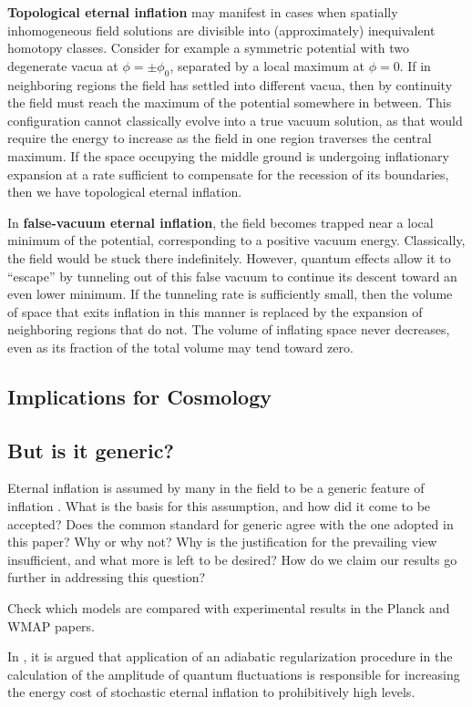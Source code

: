 \textbf{Topological eternal inflation} may manifest in cases when spatially inhomogeneous field solutions are divisible into (approximately) inequivalent homotopy classes.  
Consider for example a symmetric potential with two degenerate vacua at $\phi = \pm \phi_0$, separated by a local maximum at $\phi = 0$.  
If in neighboring regions the field has settled into different vacua, then by continuity the field must reach the maximum of the potential somewhere in between.  
This configuration cannot classically evolve into a true vacuum solution, as that would require the energy to increase as the field in one region traverses the central maximum.
If the space occupying the middle ground is undergoing inflationary expansion at a rate sufficient to compensate for the recession of its boundaries, then we have {topological eternal inflation}.

In \textbf{false-vacuum eternal inflation}, the field becomes trapped near a local minimum of the potential, corresponding to a positive vacuum energy.  Classically, the field would be stuck there indefinitely.  However, quantum effects allow it to ``escape'' by tunneling out of this false vacuum to continue its descent toward an even lower minimum.
If the tunneling rate is sufficiently small, then the volume of space that exits inflation in this manner is replaced by the expansion of neighboring regions that do not.  The volume of inflating space never decreases, even as its fraction of the total volume may tend toward zero.



\subsection{Implications for Cosmology}



\subsection{But is it generic?} 

Eternal inflation is assumed by many in the field to be a generic feature of inflation \cite{guth07}.  What is the basis for this assumption, and how did it come to be accepted?  Does the common standard for generic agree with the one adopted in this paper?  Why or why not?  Why is the justification for the prevailing view insufficient, and what more is left to be desired?  How do we claim our results go further in addressing this question?

Check which models are compared with experimental results in the Planck and WMAP papers.

In \cite{mersiniparker07}, it is argued that application of an adiabatic regularization procedure in the calculation of the amplitude of quantum fluctuations is responsible for increasing the energy cost of stochastic eternal inflation to prohibitively high levels.


